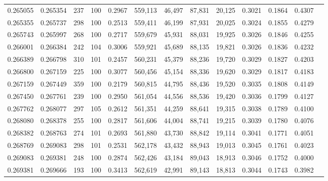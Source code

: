 \begin{tabular}{rrrrrrrrrrrrr}
0.265055 & 0.265354 &   237 & 100 &                                     0.2967 & 559,113 &  46,497 &  87,831 &  20,125 & 0.3021 & 0.1864 & 0.4307 \\
0.265355 & 0.265737 &   298 & 100 &                                     0.2513 & 559,411 &  46,199 &  87,931 &  20,025 & 0.3024 & 0.1855 & 0.4279 \\
0.265743 & 0.265997 &   268 & 100 &                                     0.2717 & 559,679 &  45,931 &  88,031 &  19,925 & 0.3026 & 0.1846 & 0.4255 \\
0.266001 & 0.266384 &   242 & 104 &                                     0.3006 & 559,921 &  45,689 &  88,135 &  19,821 & 0.3026 & 0.1836 & 0.4232 \\
0.266389 & 0.266798 &   310 & 101 &                                     0.2457 & 560,231 &  45,379 &  88,236 &  19,720 & 0.3029 & 0.1827 & 0.4203 \\
0.266800 & 0.267159 &   225 & 100 &                                     0.3077 & 560,456 &  45,154 &  88,336 &  19,620 & 0.3029 & 0.1817 & 0.4183 \\
0.267159 & 0.267449 &   359 & 100 &                                     0.2179 & 560,815 &  44,795 &  88,436 &  19,520 & 0.3035 & 0.1808 & 0.4149 \\
0.267450 & 0.267761 &   239 & 100 &                                     0.2950 & 561,054 &  44,556 &  88,536 &  19,420 & 0.3036 & 0.1799 & 0.4127 \\
0.267762 & 0.268077 &   297 & 105 &                                     0.2612 & 561,351 &  44,259 &  88,641 &  19,315 & 0.3038 & 0.1789 & 0.4100 \\
0.268080 & 0.268378 &   255 & 100 &                                     0.2817 & 561,606 &  44,004 &  88,741 &  19,215 & 0.3039 & 0.1780 & 0.4076 \\
0.268382 & 0.268763 &   274 & 101 &                                     0.2693 & 561,880 &  43,730 &  88,842 &  19,114 & 0.3041 & 0.1771 & 0.4051 \\
0.268769 & 0.269083 &   298 & 101 &                                     0.2531 & 562,178 &  43,432 &  88,943 &  19,013 & 0.3045 & 0.1761 & 0.4023 \\
0.269083 & 0.269381 &   248 & 100 &                                     0.2874 & 562,426 &  43,184 &  89,043 &  18,913 & 0.3046 & 0.1752 & 0.4000 \\
0.269381 & 0.269666 &   193 & 100 &                                     0.3413 & 562,619 &  42,991 &  89,143 &  18,813 & 0.3044 & 0.1743 & 0.3982 \\

\end{tabular}
